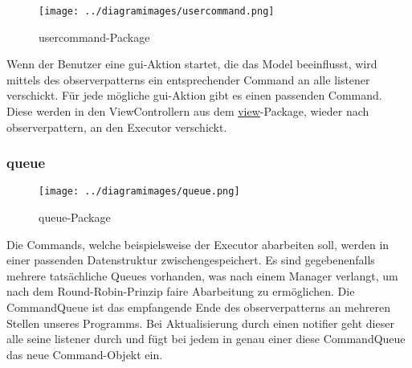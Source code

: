       \begin{figure}[H]
        \centering
        \texttt{[image: ../diagramimages/usercommand.png]}
        \caption{usercommand-Package}
      \end{figure}

      \medskip
      Wenn der Benutzer eine \gls{gui}-Aktion startet, die das Model beeinflusst,
      wird mittels des \gls{observerpattern}s ein entsprechender Command an alle \gls{listener} verschickt. Für jede mögliche
      \gls{gui}-Aktion gibt es einen passenden Command.
      Diese werden in den ViewControllern aus dem \hyperref[subsec:view]{view}-Package, wieder nach \gls{observerpattern},
      an den Executor verschickt.

      \subsubsection{queue}
      \label{subsubsec:queue}

      \begin{figure}[H]
        \centering
        \texttt{[image: ../diagramimages/queue.png]}
        \caption{queue-Package}
      \end{figure}

      \medskip
      Die Commands, welche beispielsweise der Executor abarbeiten soll, werden in
      einer passenden Datenstruktur zwischengespeichert. Es sind gegebenenfalls mehrere
      tatsächliche Queues vorhanden, was nach einem Manager verlangt, um nach dem
      Round-Robin-Prinzip faire Abarbeitung zu ermöglichen. Die CommandQueue
      ist das empfangende Ende des \gls{observerpattern}s an mehreren Stellen unseres
      Programms. Bei Aktualisierung durch einen \gls{notifier} geht dieser alle
      seine \gls{listener} durch und fügt bei jedem in genau einer diese
      CommandQueue das neue Command-Objekt ein.